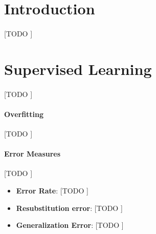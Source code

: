 \documentclass{article}
\begin{document}
	\maketitle
	\thispagestyle{firststyle}



	\begin{abstract}
		\noindent [TODO ]
	\end{abstract}



	\section{Introduction}
	\label{sec:intro}

			\paragraph{}
			[TODO ]


	\section{Supervised Learning}
	\label{sec:supervised-learning}

		\paragraph{}
		[TODO ]


		\paragraph{Overfitting}
		\label{paragraph:overfitting}
		[TODO ]

		\paragraph{Error Measures}
		\label{paragraph:error-measures}
		[TODO ]

		\begin{itemize}
			\item
				\textbf{Error Rate}:
				[TODO ]

			\item
				\textbf{Resubstitution error}:
				[TODO ]

			\item
				\textbf{Generalization Error}:
				[TODO ]

		\end{itemize}
\end{document}
